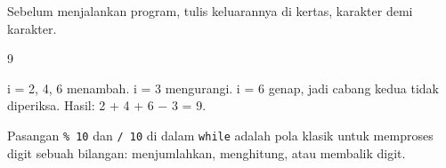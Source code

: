 \documentclass[a4paper]{article}
\begin{document}
\begin{Tebak}[]
Sebelum menjalankan program, tulis keluarannya di kertas, karakter demi karakter.
\end{Tebak}
\begin{Jawaban}[]
\begin{MKeluaran}[]
9
\end{MKeluaran}
i = 2, 4, 6 menambah. i = 3 mengurangi. i = 6 genap, jadi cabang kedua tidak diperiksa. Hasil: 2 + 4 + 6 − 3 = 9.
\end{Jawaban}
Pasangan \texttt{\% 10} dan \texttt{/ 10} di dalam \texttt{while} adalah pola klasik untuk memproses digit sebuah bilangan: menjumlahkan, menghitung, atau membalik digit.
\end{document}

